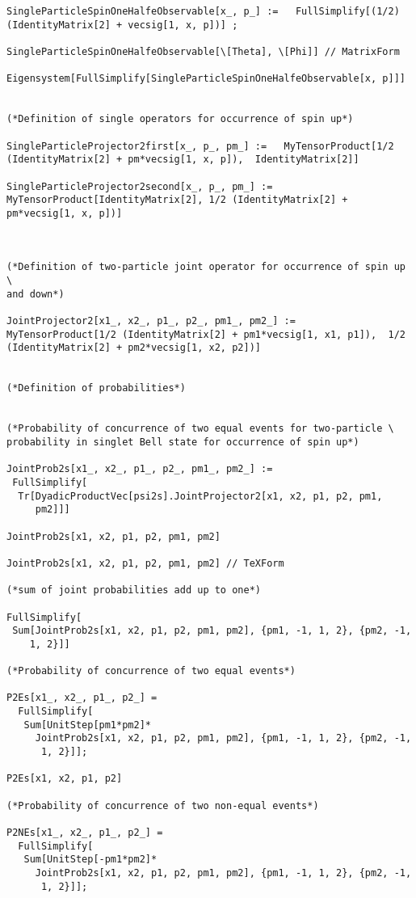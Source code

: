 \documentclass[%
 showpacs,
 showkeys,
 preprintnumbers,
 amsmath,amssymb,
 aps,
  pra,
  longbibliography,
 floatfix,
 ]{revtex4-1}
\begin{document}
{\begin{lstlisting}[backgroundcolor=\color{yellow!10},framerule=0pt,breaklines=true, frame=tb]
SingleParticleSpinOneHalfeObservable[x_, p_] :=   FullSimplify[(1/2) (IdentityMatrix[2] + vecsig[1, x, p])] ;

SingleParticleSpinOneHalfeObservable[\[Theta], \[Phi]] // MatrixForm

Eigensystem[FullSimplify[SingleParticleSpinOneHalfeObservable[x, p]]]


(*Definition of single operators for occurrence of spin up*)

SingleParticleProjector2first[x_, p_, pm_] :=   MyTensorProduct[1/2 (IdentityMatrix[2] + pm*vecsig[1, x, p]),  IdentityMatrix[2]]

SingleParticleProjector2second[x_, p_, pm_] :=  MyTensorProduct[IdentityMatrix[2], 1/2 (IdentityMatrix[2] + pm*vecsig[1, x, p])]



(*Definition of two-particle joint operator for occurrence of spin up \
and down*)

JointProjector2[x1_, x2_, p1_, p2_, pm1_, pm2_] :=  MyTensorProduct[1/2 (IdentityMatrix[2] + pm1*vecsig[1, x1, p1]),  1/2 (IdentityMatrix[2] + pm2*vecsig[1, x2, p2])]


(*Definition of probabilities*)


(*Probability of concurrence of two equal events for two-particle \
probability in singlet Bell state for occurrence of spin up*)

JointProb2s[x1_, x2_, p1_, p2_, pm1_, pm2_] :=
 FullSimplify[
  Tr[DyadicProductVec[psi2s].JointProjector2[x1, x2, p1, p2, pm1,
     pm2]]]

JointProb2s[x1, x2, p1, p2, pm1, pm2]

JointProb2s[x1, x2, p1, p2, pm1, pm2] // TeXForm

(*sum of joint probabilities add up to one*)

FullSimplify[
 Sum[JointProb2s[x1, x2, p1, p2, pm1, pm2], {pm1, -1, 1, 2}, {pm2, -1,
    1, 2}]]

(*Probability of concurrence of two equal events*)

P2Es[x1_, x2_, p1_, p2_] =
  FullSimplify[
   Sum[UnitStep[pm1*pm2]*
     JointProb2s[x1, x2, p1, p2, pm1, pm2], {pm1, -1, 1, 2}, {pm2, -1,
      1, 2}]];

P2Es[x1, x2, p1, p2]

(*Probability of concurrence of two non-equal events*)

P2NEs[x1_, x2_, p1_, p2_] =
  FullSimplify[
   Sum[UnitStep[-pm1*pm2]*
     JointProb2s[x1, x2, p1, p2, pm1, pm2], {pm1, -1, 1, 2}, {pm2, -1,
      1, 2}]];


\end{lstlisting}}
\end{document}

